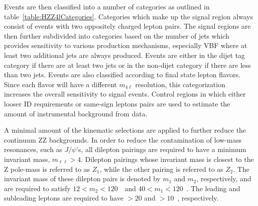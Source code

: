 Events are then classified into a number of categories as 
outlined in table~\ref{table:HZZ4lCategories}.  Categories 
which make up the 
signal region always consist of events with two oppositely 
charged lepton pairs. The signal regions are then further 
subdivided into categories based on the number of jets 
which provides sensitivity to various
production mechanisms, especially VBF where at least two 
additional jets are always produced.  Events are either 
in the dijet tag category if there are at least two jets
or in the non-dijet category if there are less than two jets.  
Events are also classified according to final state lepton
flavors. Since each flavor will have a different $m_{4\ell}$
resolution, this categorization increases the overall
sensitivity to signal events. 
Control regions in which either looser ID requirements or 
same-sign leptons pairs are used to estimate the amount of 
instrumental background from data. 


A minimal amount of the kinematic selections are applied to 
further reduce the continuum ZZ backgrounds.  In order to 
reduce the contamination of low-mass
resonances, such as $J/\psi$'s, all dilepton pairings are 
required to have a 
minimum invariant mass, $m_{\ell\ell}>4$\GeV.  Dilepton 
pairings whose invariant mass is closest to the Z pole-mass
is referred to as $Z_{1}$, while the other pairing is referred
to as $Z_{2}$.  The invariant mass of these dilepton pairs is 
denoted by $m_1$ and $m_2$, respectively, and are required
to satisfy $12<m_2<120$~\GeV~and $40<m_1<120$~\GeV.  The 
leading and subleading leptons are required to have
\pt$>20$ and \pt$>10$~\GeV, respectively.

